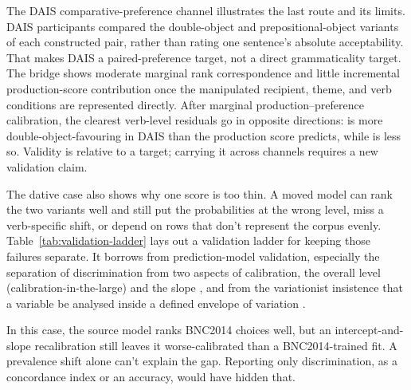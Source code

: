 The DAIS comparative-preference channel illustrates the last route and its
limits. DAIS participants compared the double-object and prepositional-object
variants of each constructed pair, rather than rating one sentence's absolute
acceptability. That makes DAIS a paired-preference target, not a direct
grammaticality target. The bridge shows moderate marginal rank correspondence
and little incremental production-score contribution once the manipulated
recipient, theme, and verb conditions are represented directly. After marginal
production--preference calibration, the clearest verb-level residuals go in
opposite directions:  is more double-object-favouring in DAIS
than the production score predicts, while  is less so. Validity is
relative to a target; carrying it across channels requires a new validation
claim.

The dative case also shows why one score is too thin. A moved model can rank the
two variants well and still put the probabilities at the wrong level, miss a
verb-specific shift, or depend on rows that don't represent the corpus evenly.
Table~\ref{tab:validation-ladder} lays out a validation ladder for keeping
those failures separate. It borrows from prediction-model validation, especially
the separation of discrimination from two aspects of calibration, the overall
level (calibration-in-the-large) and the slope \citep{VanCalsterEtAl2016Calibration}, and from the variationist
insistence that a variable be analysed inside a defined envelope of variation
\citep{weinreich1968,labov1972}.

In this case, the source model ranks BNC2014 choices well, but an
intercept-and-slope recalibration still leaves it worse-calibrated than a
BNC2014-trained fit. A prevalence shift alone can't explain the gap. Reporting
only discrimination, as a concordance index or an accuracy, would have hidden
that.

